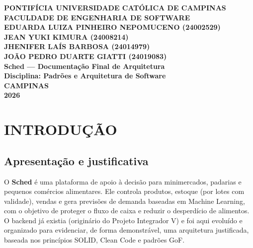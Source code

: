 \documentclass[12pt,a4paper]{article}
\begin{document}
\begin{titlepage}
    \begin{center}
        \large\textbf{PONTIFÍCIA UNIVERSIDADE CATÓLICA DE CAMPINAS}\\
        \large\textbf{FACULDADE DE ENGENHARIA DE SOFTWARE}\\
        \vspace{3cm}
        \large\textbf{EDUARDA LUIZA PINHEIRO NEPOMUCENO (24002529)}\\
        \large\textbf{JEAN YUKI KIMURA (24008214)}\\
        \large\textbf{JHENIFER LAÍS BARBOSA (24014979)}\\
        \large\textbf{JOÃO PEDRO DUARTE GIATTI (24019083)}\\
        \vspace{4cm}
        \Large\textbf{Sched — Documentação Final de Arquitetura}\\
        \vspace{1cm}
        \large\textbf{Disciplina: Padrões e Arquitetura de Software}\\
        \vfill
        \large\textbf{CAMPINAS}\\
        \large\textbf{2026}
    \end{center}
\end{titlepage}

\newpage
\thispagestyle{empty}
\tableofcontents
\cleardoublepage


\section{INTRODUÇÃO}

\subsection{Apresentação e justificativa}
O \textbf{Sched} é uma plataforma de apoio à decisão para minimercados, padarias e pequenos comércios alimentares. Ele controla produtos, estoque (por lotes com validade), vendas e gera previsões de demanda baseadas em Machine Learning, com o objetivo de proteger o fluxo de caixa e reduzir o desperdício de alimentos. O backend já existia (originário do Projeto Integrador V) e foi aqui evoluído e organizado para evidenciar, de forma demonstrável, uma arquitetura justificada, baseada nos princípios SOLID, Clean Code e padrões GoF.
\end{document}
